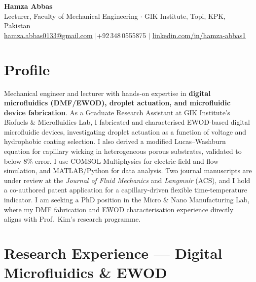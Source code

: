 \documentclass[11pt,a4paper]{article}
\begin{document}

\begin{center}
  {\LARGE\bfseries\color{accent} Hamza Abbas}\\[4pt]
  Lecturer, Faculty of Mechanical Engineering $\cdot$ GIK Institute, Topi, KPK,
  Pakistan\\[3pt]
  \href{mailto:hamza.abbas0133@gmail.com}{hamza.abbas0133@gmail.com}
  \quad$|$\quad +92\,348\,0555875
  \quad$|$\quad
  \href{https://linkedin.com/in/hamza-abbas1}{linkedin.com/in/hamza-abbas1}
\end{center}

\section{Profile}

Mechanical engineer and lecturer with hands-on expertise in
\textbf{digital microfluidics (DMF/EWOD), droplet actuation, and microfluidic
device fabrication}. As a Graduate Research Assistant at GIK Institute's Biofuels
\& Microfluidics Lab, I fabricated and characterised EWOD-based digital microfluidic
devices, investigating droplet actuation as a function of voltage and hydrophobic
coating selection. I also derived a modified Lucas--Washburn equation for capillary
wicking in heterogeneous porous substrates, validated to below 8\% error. I use
COMSOL Multiphysics for electric-field and flow simulation, and MATLAB/Python for
data analysis. Two journal manuscripts are under review at the \textit{Journal of
Fluid Mechanics} and \textit{Langmuir} (ACS), and I hold a co-authored patent
application for a capillary-driven flexible time-temperature indicator. I am seeking
a PhD position in the Micro \& Nano Manufacturing Lab, where my DMF fabrication and
EWOD characterisation experience directly aligns with Prof.\ Kim's research programme.

\section{Research Experience — Digital Microfluidics \& EWOD}
\end{document}
